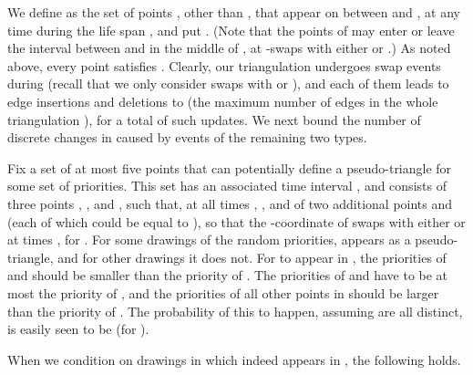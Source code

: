 \documentclass[11pt]{article}
\begin{document}
\medskip
{}
We define  as the set of points , other than
, that appear on  between  and
, at any time during the life span , and put
. (Note that the points of  may enter or leave the interval between  and  in the middle of , at -swaps with either  or .) As noted above, every point  satisfies
.  Clearly, our triangulation undergoes
 swap events during  (recall that we only consider
swaps with  or ), and each of
them leads to  edge insertions and deletions to 
(the maximum number of edges in the whole triangulation ),
for a total of  such updates. We next bound the number of
discrete changes in  caused by events of the remaining two
types.

Fix a set of at most five points that can potentially define a
pseudo-triangle for some set of priorities.  This set has an associated time interval , and consists of
three points , , and , such that, at all times ,
, and of two additional points  and
 (each of which could be equal to ), so that the -coordinate of  swaps
with either  or  at times , for . For some drawings of the random priorities,  appears as 
a pseudo-triangle, and for other drawings it does not.
For  to appear in , the priorities of 
 and
 should be smaller than the priority of 
. The priorities of  and  have to be at most the priority of ,
and the priorities of all other points in   should be larger than
the priority of . The probability of this to happen, assuming  are all distinct, is easily seen to be  (for ).


When we
condition on drawings in which 
  indeed appears in  , the following holds.
\end{document}
